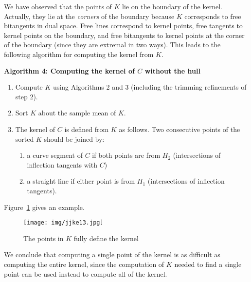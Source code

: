 \documentclass[12pt]{article}
\newif\ifJournal
\begin{document}

We have observed that the points of $K$ lie on the boundary of the kernel.
Actually, they lie at the {\em corners} of the boundary because
$K$ corresponds to free bitangents in dual space.
Free lines correspond to kernel points, free tangents to kernel
points on the boundary, and free bitangents to kernel points at the
corner of the boundary (since they are extremal in two ways).
This leads to the following algorithm for computing the kernel from $K$.

\vspace{.2in}

\centerline{{\bf Algorithm 4: Computing the kernel of $C$ without the hull}}

\begin{enumerate}
\item Compute $K$ using Algorithms 2 and 3 (including the trimming refinements of step 2).
\item Sort $K$ about the sample mean of $K$.
\item The kernel of $C$ is defined from $K$ as follows.
      Two consecutive points of the sorted $K$ should be joined by:
\begin{enumerate}
\item a curve segment of $C$ if both points are from $H_2$ 
(intersections of inflection tangents with $C$)
\item a straight line if either point is from $H_1$ 
(intersections of inflection tangents).
\end{enumerate}
\end{enumerate}

Figure~\ref{fig:nohull} gives an example.

\ifJournal
These connections of the points of $K$ mimic the behaviour of the
convex hull in dual space.
\fi

\begin{figure}
\begin{center}
\texttt{[image: img/jjke13.jpg]}
\end{center}
\caption{The points in $K$ fully define the kernel}
\label{fig:nohull}
\end{figure}

We conclude that computing a single point of the kernel is as difficult
as computing the entire kernel,
since the computation of $K$ needed to find a single point can be used
instead to compute all of the kernel.
\end{document}
